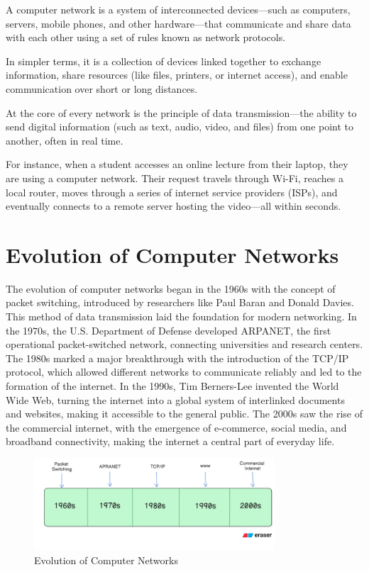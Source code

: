 A computer network is a system of interconnected devices—such as computers, servers, mobile phones, and other hardware—that communicate and share data with each other using a set of rules known as network protocols.

In simpler terms, it is a collection of devices linked together to exchange information, share resources (like files, printers, or internet access), and enable communication over short or long distances.

At the core of every network is the principle of data transmission—the ability to send digital information (such as text, audio, video, and files) from one point to another, often in real time.

\begin{examplebox}
    For instance, when a student accesses an online lecture from their laptop, they are using a computer network. Their request travels through Wi-Fi, reaches a local router, moves through a series of internet service providers (ISPs), and eventually connects to a remote server hosting the video—all within seconds.
\end{examplebox}

\section{Evolution of Computer Networks}

The evolution of computer networks began in the 1960s with the concept of packet switching, introduced by researchers like Paul Baran and Donald Davies. This method of data transmission laid the foundation for modern networking. In the 1970s, the U.S. Department of Defense developed ARPANET, the first operational packet-switched network, connecting universities and research centers. The 1980s marked a major breakthrough with the introduction of the TCP/IP protocol, which allowed different networks to communicate reliably and led to the formation of the internet. In the 1990s, Tim Berners-Lee invented the World Wide Web, turning the internet into a global system of interlinked documents and websites, making it accessible to the general public. The 2000s saw the rise of the commercial internet, with the emergence of e-commerce, social media, and broadband connectivity, making the internet a central part of everyday life.

\begin{figure}[H]
    \centering
    \includegraphics[width=0.8\textwidth]{images/chapter1/fig3.png}
    \caption{Evolution of Computer Networks}
    \label{fig:evolution-of-cn}
\end{figure}



